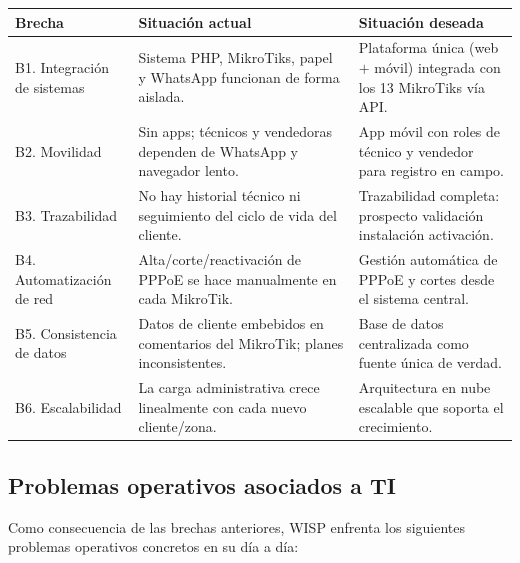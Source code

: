 \begin{center}
\label{tab:brechas}
\begin{tabularx}{\textwidth}{L{2.9cm} X X}
\toprule
\textbf{Brecha} & \textbf{Situación actual} & \textbf{Situación deseada} \\
\midrule
B1. Integración de sistemas &
Sistema PHP, MikroTiks, papel y WhatsApp funcionan de forma aislada. &
Plataforma única (web $+$ móvil) integrada con los 13 MikroTiks vía API. \\
B2. Movilidad &
Sin apps; técnicos y vendedoras dependen de WhatsApp y navegador lento. &
App móvil con roles de técnico y vendedor para registro en campo. \\
B3. Trazabilidad &
No hay historial técnico ni seguimiento del ciclo de vida del cliente. &
Trazabilidad completa: prospecto \textrightarrow{} validación \textrightarrow{} instalación \textrightarrow{} activación. \\
B4. Automatización de red &
Alta/corte/reactivación de PPPoE se hace manualmente en cada MikroTik. &
Gestión automática de PPPoE y cortes desde el sistema central. \\
B5. Consistencia de datos &
Datos de cliente embebidos en comentarios del MikroTik; planes inconsistentes. &
Base de datos centralizada como fuente única de verdad. \\
B6. Escalabilidad &
La carga administrativa crece linealmente con cada nuevo cliente/zona. &
Arquitectura en nube escalable que soporta el crecimiento. \\
\bottomrule
\end{tabularx}
\end{center}

\subsection{Problemas operativos asociados a TI}

Como consecuencia de las brechas anteriores, WISP enfrenta los siguientes problemas
operativos concretos en su día a día:

